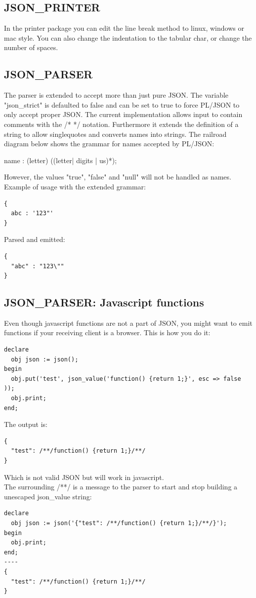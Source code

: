 \documentclass[11pt,a4paper]{article}
\begin{document}
\subsection*{JSON\_PRINTER}
In the printer package you can edit the line break method to linux, windows or mac style. You can also change the indentation to the tabular char, or change the number of spaces.

\subsection*{JSON\_PARSER}
The parser is extended to accept more than just pure JSON. The variable "json\_strict" is defaulted to false and can be set to true to force PL/JSON to only accept proper JSON. The current implementation allows input to contain comments with the /* */  notation. Furthermore it extends the definition of a string to allow singlequotes and converts names into strings. The railroad diagram below shows the grammar for names accepted by PL/JSON:
\begin{rail}
name     : (letter) ((letter| digits | us)*);
\end{rail}
However, the values "true", "false" and "null" will not be handled as names.\\
Example of usage with the extended grammar:
\begin{verbatim}
{
  abc : '123"'
}
\end{verbatim}
Parsed and emitted:
\begin{verbatim}
{
  "abc" : "123\""
}
\end{verbatim}

\subsection*{JSON\_PARSER: Javascript functions}
Even though javascript functions are not a part of JSON, you might want to emit functions if your receiving client is a browser. This is how you do it:
\begin{verbatim}
declare
  obj json := json();
begin
  obj.put('test', json_value('function() {return 1;}', esc => false ));
  obj.print;
end;
\end{verbatim}
The output is:
\begin{verbatim}
{
  "test": /**/function() {return 1;}/**/
}
\end{verbatim}
Which is not valid JSON but will work in javascript.\\
The surrounding /**/ is a message to the parser to start and stop building a unescaped json\_value string:
\begin{verbatim}
declare
  obj json := json('{"test": /**/function() {return 1;}/**/}');
begin
  obj.print;
end;
----
{
  "test": /**/function() {return 1;}/**/
}
\end{verbatim}
\end{document}
